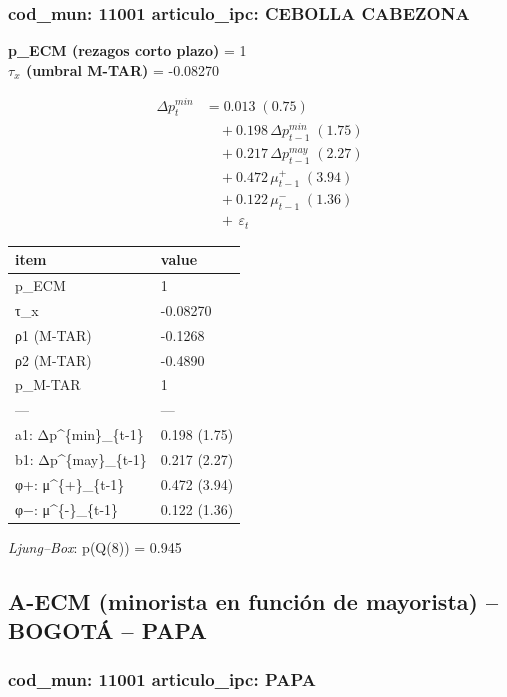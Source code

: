 \documentclass[
  12pt,
]{article}
\begin{document}
\subsubsection{cod\_mun: 11001 \textbar{} articulo\_ipc: CEBOLLA
CABEZONA}\label{cod_mun-11001-articulo_ipc-cebolla-cabezona}

\textbf{p\_ECM (rezagos corto plazo)} = 1\\
\textbf{\(\tau_x\) (umbral M-TAR)} = -0.08270

\[
\begin{aligned}
\Delta p^{min}_{t} &= 0.013\;(0.75) \\
&\quad + 0.198\,\Delta p^{min}_{t-1}\;(1.75) \\
&\quad + 0.217\,\Delta p^{may}_{t-1}\;(2.27) \\
&\quad + 0.472\,\mu^{+}_{t-1}\;(3.94) \\
&\quad + 0.122\,\mu^{-}_{t-1}\;(1.36) \\
&\quad +\, \varepsilon_t
\end{aligned}
\]

\begin{longtable}[t]{ll}
\toprule
item & value\\
\midrule
p\_ECM & 1\\
τ\_x & -0.08270\\
ρ1 (M-TAR) & -0.1268\\
ρ2 (M-TAR) & -0.4890\\
p\_M-TAR & 1\\
\addlinespace
— & —\\
a1: Δp\textasciicircum{}\{min\}\_\{t-1\} & 0.198 (1.75)\\
b1: Δp\textasciicircum{}\{may\}\_\{t-1\} & 0.217 (2.27)\\
φ+: μ\textasciicircum{}\{+\}\_\{t-1\} & 0.472 (3.94)\\
φ−: μ\textasciicircum{}\{-\}\_\{t-1\} & 0.122 (1.36)\\
\bottomrule
\end{longtable}

\emph{Ljung--Box}: p(Q(8)) = 0.945

\subsection{A-ECM (minorista en función de mayorista) -- BOGOTÁ --
PAPA}\label{a-ecm-minorista-en-funciuxf3n-de-mayorista-bogotuxe1-papa}

\subsubsection{cod\_mun: 11001 \textbar{} articulo\_ipc:
PAPA}\label{cod_mun-11001-articulo_ipc-papa}
\end{document}
